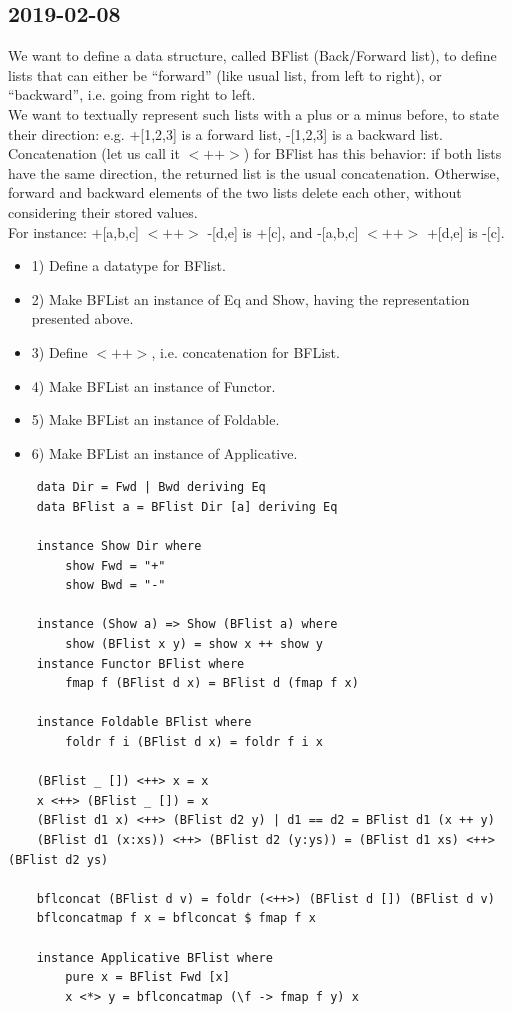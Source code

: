 \subsection{2019-02-08}
We want to define a data structure, called BFlist (Back/Forward list), to define lists that can either be “forward” (like usual list, from left to right), or “backward”, i.e. going from right to left. \\
We want to textually represent such lists with a plus or a minus before, to state their direction: e.g. +[1,2,3] is a forward list, -[1,2,3] is a backward list. \\
Concatenation (let us call it $<++>$) for BFlist has this behavior: if both lists have the same direction, the returned list is the usual concatenation. Otherwise, forward and backward elements of the two lists delete each other, without considering their stored values. \\
For instance: +[a,b,c] $<++>$ -[d,e] is +[c], and -[a,b,c] $<++>$ +[d,e] is -[c].
\begin{itemize}
    \item 1) Define a datatype for BFlist.
    \item 2) Make BFList an instance of Eq and Show, having the representation presented above.
    \item 3) Define $<++>$, i.e. concatenation for BFList.
    \item 4) Make BFList an instance of Functor.
    \item 5) Make BFList an instance of Foldable.
    \item 6) Make BFList an instance of Applicative.
\end{itemize}
\begin{lstlisting}
    data Dir = Fwd | Bwd deriving Eq
    data BFlist a = BFlist Dir [a] deriving Eq

    instance Show Dir where
        show Fwd = "+"
        show Bwd = "-"

    instance (Show a) => Show (BFlist a) where
        show (BFlist x y) = show x ++ show y
    instance Functor BFlist where
        fmap f (BFlist d x) = BFlist d (fmap f x)

    instance Foldable BFlist where
        foldr f i (BFlist d x) = foldr f i x
    
    (BFlist _ []) <++> x = x
    x <++> (BFlist _ []) = x
    (BFlist d1 x) <++> (BFlist d2 y) | d1 == d2 = BFlist d1 (x ++ y)
    (BFlist d1 (x:xs)) <++> (BFlist d2 (y:ys)) = (BFlist d1 xs) <++> (BFlist d2 ys)
    
    bflconcat (BFlist d v) = foldr (<++>) (BFlist d []) (BFlist d v)
    bflconcatmap f x = bflconcat $ fmap f x
    
    instance Applicative BFlist where
        pure x = BFlist Fwd [x]
        x <*> y = bflconcatmap (\f -> fmap f y) x
\end{lstlisting}

